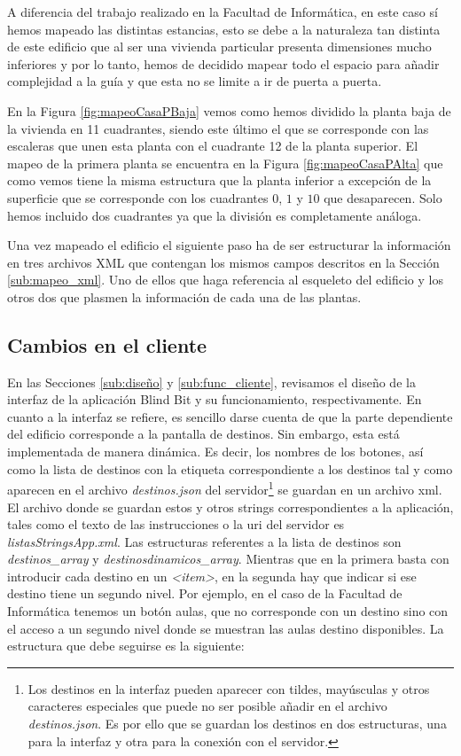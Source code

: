 A diferencia del trabajo realizado en la Facultad de Informática, en este caso sí hemos mapeado las distintas estancias, esto se debe a la naturaleza tan distinta de este edificio que al ser una vivienda particular presenta dimensiones mucho inferiores y por lo tanto, hemos de decidido mapear todo el espacio para añadir complejidad a la guía y que esta no se limite a ir de puerta a puerta.

En la Figura \ref{fig:mapeoCasaPBaja} vemos como hemos dividido la planta baja de la vivienda en 11 cuadrantes, siendo este último el que se corresponde con las escaleras que unen esta planta con el cuadrante 12 de la planta superior. El mapeo de la primera planta se encuentra en la Figura \ref{fig:mapeoCasaPAlta} que como vemos tiene la misma estructura que la planta inferior a excepción de la superficie que se corresponde con los cuadrantes $0$, $1$ y $10$ que desaparecen. Solo hemos incluido dos cuadrantes ya que la división es completamente análoga.

Una vez mapeado el edificio el siguiente paso ha de ser estructurar la información en tres archivos XML que contengan los mismos campos descritos en la Sección \ref{sub:mapeo_xml}. Uno de ellos que haga referencia al esqueleto del edificio y los otros dos que plasmen la información de cada una de las plantas. %



\subsection{Cambios en el cliente}
\label{sub:cambiosCliente}

En las Secciones \ref{sub:diseño} y \ref{sub:func_cliente}, revisamos el diseño de la interfaz de la aplicación Blind Bit y su funcionamiento, respectivamente. En cuanto a la interfaz se refiere, es sencillo darse cuenta de que la parte dependiente del edificio corresponde a la pantalla de destinos. Sin embargo, esta está implementada de manera dinámica. Es decir, los nombres de los botones, así como la lista de destinos con la etiqueta correspondiente a los destinos tal y como aparecen en el archivo \textit{destinos.json} del servidor\footnote{Los destinos en la interfaz pueden aparecer con tildes, mayúsculas y otros caracteres especiales que puede no ser posible añadir en el archivo \textit{destinos.json}. Es por ello que se guardan los destinos en dos estructuras, una para la interfaz y otra para la conexión con el servidor.} se guardan en un archivo xml. El archivo donde se guardan estos y otros strings correspondientes a la aplicación, tales como el texto de las instrucciones o la uri del servidor es \textit{listasStringsApp.xml}. Las estructuras referentes a la lista de destinos son \textit{destinos\_array} y \textit{destinosdinamicos\_array}. Mientras que en la primera basta con introducir cada destino en un \textit{<item>}, en la segunda hay que indicar si ese destino tiene un segundo nivel. Por ejemplo, en el caso de la Facultad de Informática tenemos un botón aulas, que no corresponde con un destino sino con el acceso a un segundo nivel donde se muestran las aulas destino disponibles. La estructura que debe seguirse es la siguiente: 


